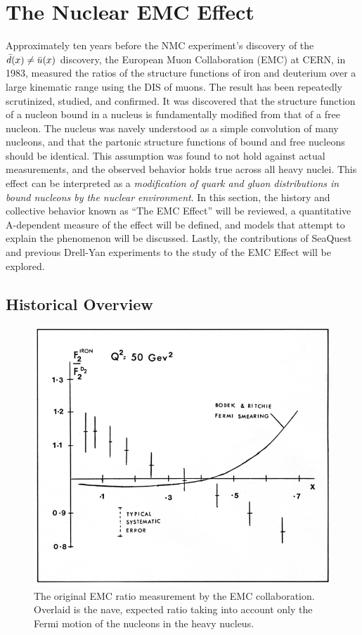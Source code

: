 \section{The Nuclear EMC Effect}

Approximately ten years before the NMC experiment's discovery of the $\bar{d}(x)\neq\bar{u}(x)$ discovery, the European Muon Collaboration (EMC) at CERN, in 1983, measured the ratios of the structure functions of iron and deuterium over a large kinematic range using the DIS of muons\cite{Aubert:1983xm}. The result has been repeatedly scrutinized, studied, and confirmed. It was discovered that the structure function of a nucleon bound in a nucleus is fundamentally modified from that of a free nucleon. The nucleus was navely understood as a simple convolution of many nucleons, and that the partonic structure functions of bound and free nucleons should be identical. This assumption was found to not hold against actual measurements, and the observed behavior holds true across all heavy nuclei. This effect can be interpreted as a \emph{modification of quark and gluon distributions in bound nucleons by the nuclear environment}. In this section, the history and collective behavior known as ``The EMC Effect'' will be reviewed, a quantitative A-dependent measure of the effect will be defined, and models that attempt to explain the phenomenon will be discussed. Lastly, the contributions of SeaQuest and previous Drell-Yan experiments to the study of the EMC Effect will be explored.

\subsection{Historical Overview} \label{ssec:emc-history}

\begin{figure}
	\centering
	\includegraphics[height=0.35\textheight]{figures/background/emc_effect_original-v2.jpg}
	\caption{The original EMC ratio measurement by the EMC collaboration\cite{Aubert:1983xm}. Overlaid is the nave, expected ratio taking into account only the Fermi motion of the nucleons in the heavy nucleus.}
	\label{fig:emc-one-naive}
\end{figure}


